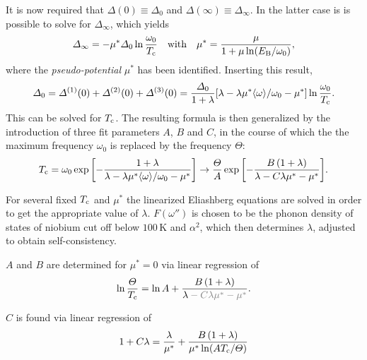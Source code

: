 It is now required that $\Delta(0) \equiv \Delta_0$ and $\Delta(\infty) \equiv
\Delta_\infty$. In the latter case is is possible to solve for $\Delta_\infty$,
which yields
%
\begin{equation*}
    \varDelta_\infty = -\mu^* \varDelta_0 \ln \frac{\omega_0}{T \sb{\text{c}}}
    \quad \text{with} \quad
    \mu^* = \frac \mu {1 + \mu \ln(E \sb{\text{B}} / \omega_0)},
\end{equation*}
%
where the \emph{ pseudo-potential} $\mu^*$ has been identified.
Inserting this result,
%
\begin{equation*}
    \varDelta_0 = \varDelta^{(1)}(0) + \varDelta^{(2)}(0) + \varDelta^{(3)}(0)
    = \frac{\varDelta_0}{1 + \lambda}
    [\lambda - \lambda \mu^* \langle\omega\rangle / \omega_0 - \mu^*]
    \ln \frac{\omega_0}{T \sb{\text{c}}}.
\end{equation*}
%
This can be solved for $T \sb{\text{c}}$. The resulting formula is then generalized by
the introduction of three fit parameters $A$, $B$ and $C$, in the course of
which the the maximum frequency $\omega_0$ is replaced by the 
frequency $\Theta$:
%
\begin{equation*}
    T \sb{\text{c}} = \omega_0 \exp \bigg[ {-\frac
        {1 + \lambda}
        {\lambda - \lambda \mu^* \langle\omega\rangle / \omega_0 - \mu^*}}
    \bigg]
    \rightarrow \frac {\varTheta} A \exp \bigg[ {-\frac
        {B \, (1 + \lambda)}
        {\lambda - C \lambda \mu^* - \mu^*}}
    \bigg].
\end{equation*}

For several fixed $T \sb{\text{c}}$ and $\mu^*$ the linearized Eliashberg equations are
solved in order to get the appropriate value of $\lambda$. $F(\omega'')$ is
chosen to be the phonon density of states of niobium \cite{NakagawaWoods63} cut
off below $100\,\mathrm{K}$ and $\alpha^2$, which then determines $\lambda$,
adjusted to obtain self-consistency.

$A$ and $B$ are determined for $\mu^* = 0$ via linear regression of
%
\begin{equation*}
    \ln \frac \Theta {T \sub c} = \ln A + \frac
        {B \, (1 + \lambda)}
        {\lambda \textcolor{gray}{{} - C \lambda \mu^* - \mu^*}}.
\end{equation*}

$C$ is found via linear regression of
%
\begin{equation*}
    1 + C \lambda = \frac \lambda {\mu^*}
    + \frac{B \, (1 + \lambda)}{\mu^* \ln (A T \sb{\text{c}} / \varTheta)}
\end{equation*}


